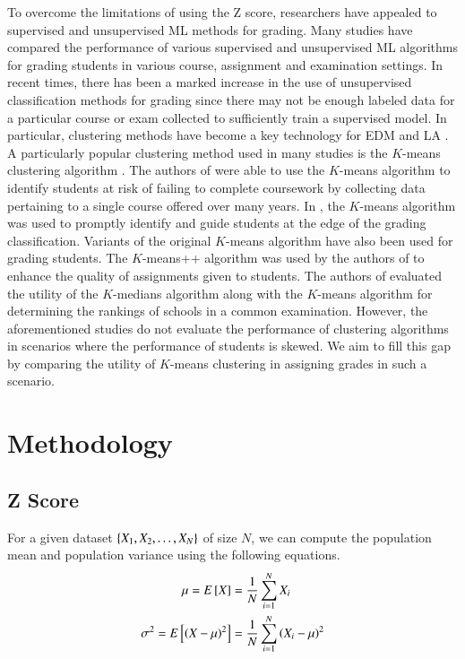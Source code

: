 \documentclass[conference]{IEEEtran}
\begin{document}
To overcome the limitations of using the Z score, researchers have appealed to
supervised and unsupervised ML methods for grading. Many studies
\cite{badalPredictiveModellingAnalytics2023,
palkhiwalaAnalysisMachineLearning2022, bujangMulticlassPredictionModel2021,
gullImprovingLearningExperience2020} have compared the performance of various
supervised and unsupervised ML algorithms for grading students in various
course, assignment and examination settings. In recent times, there has been a
marked increase in the use of unsupervised classification methods for grading
since there may not be enough labeled data for a particular course or exam
collected to sufficiently train a supervised model. In particular, clustering
methods have become a key technology for EDM and LA
\cite{zhangBriefAnalysisKey2018}. A particularly popular clustering method used
in many studies is the $K$-means clustering algorithm
\cite{macqueenMethodsClassificationAnalysis1967}. The authors of
\cite{bucosStudentClusterAnalysis2020} were able to use the $K$-means algorithm
to identify students at risk of failing to complete coursework by collecting
data pertaining to a single course offered over many years. In
\cite{wangAlgorithmStudentGrade2022}, the $K$-means algorithm was used to promptly
identify and guide students at the edge of the grading classification. Variants
of the original $K$-means algorithm have also been used for grading students.
The $K$-means++ algorithm was used by the authors of
\cite{jimenez-maciasStudentClusteringKMeans2024} to enhance the quality of
assignments given to students. The authors of
\cite{bhartiCentroidBasedClustering2024} evaluated the utility of the
$K$-medians algorithm along with the $K$-means algorithm for determining the
rankings of schools in a common examination. However, the aforementioned studies
do not evaluate the performance of clustering algorithms in scenarios where the
performance of students is skewed. We aim to fill this gap by comparing the
utility of $K$-means clustering in assigning grades in such a scenario.

\section{Methodology}
\label{sec:methodology}

\subsection{Z Score}
For a given dataset $\left\{X_1, X_2, \ldots, X_N\right\}$ of size $N$, we can compute
the population mean and population variance using the following equations.
\begin{align}
    \mu = E\left[ X \right] &= \frac{1}{N}\sum_{i=1}^N X_i \\
    \sigma^2 = E\left[ \left(X-\mu\right)^2 \right] &= \frac{1}{N}\sum_{i=1}^N\left(X_i-\mu\right)^2
    \label{eq:pop-param}
\end{align}
\end{document}
